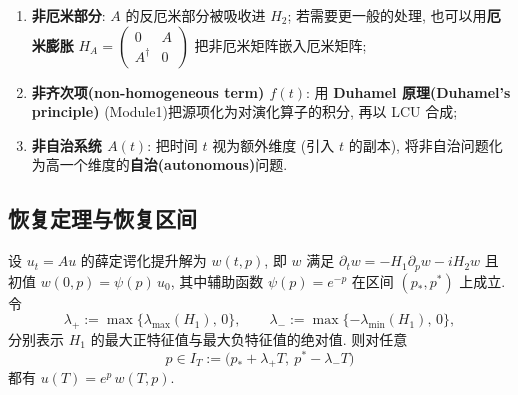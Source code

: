 \documentclass[utf8]{article} %
\numberwithin{equation}{section}   %
\newtheorem{Thm}{\hskip 2em {\color{blue} 定理}}[subsection]
\newtheorem{Note}{\hskip 2em {\color{red} 注}}[subsection]
\begin{document}
\begin{Note}[三种情形的处理]
    \begin{enumerate}
        \item \textbf{非厄米部分}: $A$ 的反厄米部分被吸收进 $H_2$;
        若需要更一般的处理, 也可以用\textbf{厄米膨胀}
        $H_A = \begin{pmatrix} 0 & A \\ A^\dagger & 0 \end{pmatrix}$
        把非厄米矩阵嵌入厄米矩阵;
        \item \textbf{非齐次项(non-homogeneous term) $f(t)$}: 用 \textbf{Duhamel 原理(Duhamel's principle)}
        (Module1)把源项化为对演化算子的积分, 再以 LCU 合成;
        \item \textbf{非自治系统 $A(t)$}: 把时间 $t$ 视为额外维度
        (引入 $t$ 的副本), 将非自治问题化为高一个维度的\textbf{自治(autonomous)}问题.
    \end{enumerate}
\end{Note}

\subsection{恢复定理与恢复区间}

\begin{Thm}[恢复定理]
    设 $u_t = Au$ 的薛定谔化提升解为 $w(t,p)$, 即 $w$ 满足
    $\partial_t w = -H_1\partial_p w - iH_2 w$ 且初值
    $w(0,p) = \psi(p)\,u_0$, 其中辅助函数 $\psi(p) = e^{-p}$ 在区间 $(p_*, p^*)$ 上成立.
    令
    \begin{equation}
        \lambda_+ := \max\{\lambda_{\max}(H_1),\, 0\}, \qquad
        \lambda_- := \max\{-\lambda_{\min}(H_1),\, 0\},
    \end{equation}
    分别表示 $H_1$ 的最大正特征值与最大负特征值的绝对值. 则对任意
    \begin{equation}
        p \in I_T := \big(p_* + \lambda_+ T,\ p^* - \lambda_- T\big)
    \end{equation}
    都有 $u(T) = e^{p}\, w(T,p)$.
\end{Thm}
\end{document}
